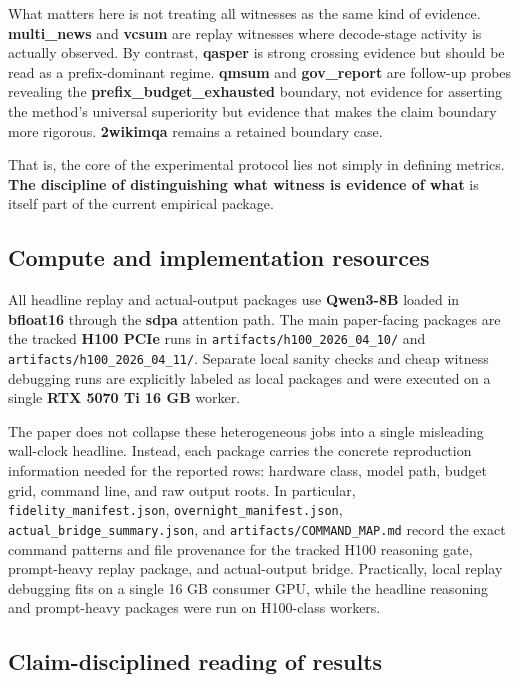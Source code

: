 What matters here is not treating all witnesses as the same kind of evidence. \textbf{multi\_news} and \textbf{vcsum} are replay witnesses where decode-stage activity is actually observed. By contrast, \textbf{qasper} is strong crossing evidence but should be read as a prefix-dominant regime. \textbf{qmsum} and \textbf{gov\_report} are follow-up probes revealing the \textbf{prefix\_budget\_exhausted} boundary, not evidence for asserting the method's universal superiority but evidence that makes the claim boundary more rigorous. \textbf{2wikimqa} remains a retained boundary case.


That is, the core of the experimental protocol lies not simply in defining metrics. \textbf{The discipline of distinguishing what witness is evidence of what} is itself part of the current empirical package.


\subsection{Compute and implementation resources}


All headline replay and actual-output packages use \textbf{Qwen3-8B} loaded in \textbf{bfloat16} through the \textbf{sdpa} attention path. The main paper-facing packages are the tracked \textbf{H100 PCIe} runs in \texttt{artifacts/h100\_2026\_04\_10/} and \texttt{artifacts/h100\_2026\_04\_11/}. Separate local sanity checks and cheap witness debugging runs are explicitly labeled as local packages and were executed on a single \textbf{RTX 5070 Ti 16 GB} worker. \CASKRepoSentence


The paper does not collapse these heterogeneous jobs into a single misleading wall-clock headline. Instead, each package carries the concrete reproduction information needed for the reported rows: hardware class, model path, budget grid, command line, and raw output roots. In particular, \texttt{fidelity\_manifest.json}, \texttt{overnight\_manifest.json}, \texttt{actual\_bridge\_summary.json}, and \texttt{artifacts/COMMAND\_MAP.md} record the exact command patterns and file provenance for the tracked H100 reasoning gate, prompt-heavy replay package, and actual-output bridge. Practically, local replay debugging fits on a single 16 GB consumer GPU, while the headline reasoning and prompt-heavy packages were run on H100-class workers.


\subsection{Claim-disciplined reading of results}


